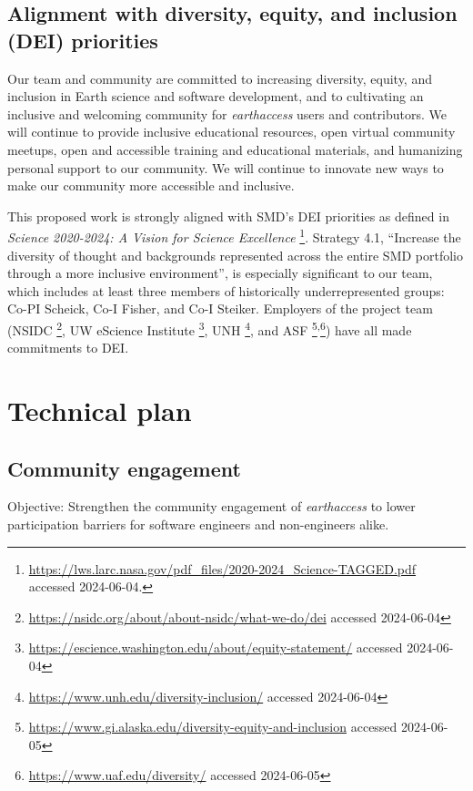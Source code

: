 \documentclass{ROSES-NASA-proposal}
\newcommand{\earthaccess}{\textit{earthaccess}\xspace} %
\begin{document}
\subsection{Alignment with diversity, equity, and inclusion (DEI) priorities}

Our team and community are committed to increasing diversity, equity, and inclusion in Earth science and software development, and to cultivating an inclusive and welcoming community for \earthaccess users and contributors. We will continue to provide inclusive educational resources, open virtual community meetups, open and accessible training and educational materials, and humanizing personal support to our community. We will continue to innovate new ways to make our community more accessible and inclusive.

This proposed work is strongly aligned with SMD's DEI priorities as defined in \textit{Science 2020-2024: A Vision for Science Excellence} \footnote{\url{https://lws.larc.nasa.gov/pdf_files/2020-2024_Science-TAGGED.pdf} accessed 2024-06-04.}. Strategy 4.1, ``Increase the diversity of thought and backgrounds represented across the entire SMD portfolio through a more inclusive environment'', is especially significant to our team, which includes at least three members of historically underrepresented groups: Co-PI Scheick, Co-I Fisher, and Co-I Steiker. Employers of the project team (NSIDC \footnote{\url{https://nsidc.org/about/about-nsidc/what-we-do/dei} accessed 2024-06-04}, UW eScience Institute \footnote{\url{https://escience.washington.edu/about/equity-statement/} accessed 2024-06-04}, UNH \footnote{\url{https://www.unh.edu/diversity-inclusion/} accessed 2024-06-04}, and ASF \footnote{\url{https://www.gi.alaska.edu/diversity-equity-and-inclusion} accessed 2024-06-05}\textsuperscript{,}\footnote{\url{https://www.uaf.edu/diversity/} accessed 2024-06-05}) have all made commitments to DEI.


\section{Technical plan}

\subsection{Community engagement} \label{community}

\begin{boxC}
Objective: Strengthen the community engagement of \earthaccess to lower participation barriers for software engineers and non-engineers alike.
\end{boxC}
\end{document}

